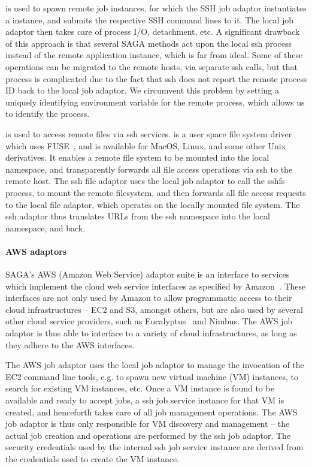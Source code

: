 \documentclass[3p,twocolumn]{elsarticle}
\begin{document}
\ssh is used to spawn remote job instances, for which the SSH job
adaptor instantiates a   instance, and
submits the respective SSH command lines to it.  The local job adaptor
then takes care of process I/O, detachment, etc.  A significant
drawback of this approach is that several SAGA methods act upon the
local ssh process instead of the remote application instance, which is
far from ideal. Some of these operations can be migrated to the remote
hosts, via separate ssh calls, but that process is complicated due to
the fact that ssh does not report the remote process ID back to the
local job adaptor.  We circumvent this problem by setting a uniquely
identifying environment variable for the remote process, which allows
us to identify the process.

\sshfs is used to access remote files via ssh services.  \sshfs is a
user space file system driver which uses FUSE~\cite{fuse-url}, and is
available for MacOS, Linux, and some other Unix derivatives.  It
enables a remote file system to be mounted into the local namespace,
and transparently forwards all file access operations via ssh to the
remote host.  The ssh file adaptor uses the local job adaptor to call
the sshfs process, to mount the remote filesystem, and then forwards
all file access requests to the local file adaptor, which operates on
the locally mounted file system.  The ssh adaptor thus translates URLs
from the ssh namespace into the local namespace, and back.


\paragraph{AWS adaptors} 

SAGA's AWS (Amazon Web Service) adaptor suite is an interface to
services which implement the cloud web service interfaces as specified
by Amazon~\cite{ec2-url}.  These interfaces are not only used by Amazon
to allow programmatic access to their cloud infrastructures -- EC2 and
S3, amongst others, but are also used by several other cloud service
providers, such as Eucalyptus~\cite{eucalyptus} and Nimbus.  The AWS
job adaptor is thus able to interface to a variety of cloud
infrastructures, as long as they adhere to the AWS interfaces.

The AWS job adaptor uses the local job adaptor to manage the
invocation of the EC2 command line tools, e.g. to spawn new virtual
machine (VM) instances, to search for existing VM instances, etc.
Once a VM instance is found to be available and ready to accept jobs,
a ssh job service instance for that VM is created, and henceforth
takes care of all job management operations.  The AWS job adaptor is
thus only responsible for VM discovery and management -- the actual
job creation and operations are performed by the ssh job adaptor.  The
security credentials used by the internal ssh job service instance are
derived from the credentials used to create the VM instance.
\end{document}
